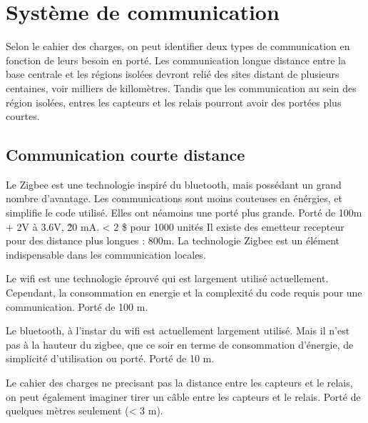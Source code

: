 \section{Système de communication}

Selon le cahier des charges, on peut identifier deux types de communication en fonction de leurs besoin en porté.
Les communication longue distance entre la base centrale et les régions isolées devront relié des sites distant de plusieurs centaines, voir milliers de killomètres.
Tandis que les communication au sein des région isolées, entres les capteurs et les relais pourront avoir des portées plus courtes.



    \subsection{Communication courte distance}

            { Le Zigbee est une technologie inspiré du bluetooth, mais possédant un grand nombre d'avantage.
            Les communications sont moins couteuses en énérgies, et simplifie le code utilisé.
            Elles ont néamoins une porté plus grande.}
            {Porté de 100m +
            }
            {2V à 3.6V, \~20 mA.
            }
            {< 2 \$ pour 1000 unités
            }
            {Il existe des emetteur recepteur pour des distance plus longues : 800m.
            }
            {La technologie Zigbee est un élément indispensable dans les communication locales.
            }

            { Le wifi est une technologie éprouvé qui est largement utilisé actuellement.
            Cependant, la consommation en energie et la complexité du code requis pour une communication. }
            {Porté de 100 m.
            }
            {
            }
            {
            }
            {
            }
            {
            }

            { Le bluetooth, à l'instar du wifi est actuellement largement utilisé.
            Mais il n'est pas à la hauteur du zigbee, que ce soir en terme de consommation d'énergie, de simplicité d'utilisation ou porté.}
            {Porté de 10 m.
            }
            {
            }
            {
            }
            {
            }
            {
            }
            
            { Le cahier des charges ne precisant pas la distance entre les capteurs et le relais, on peut également imaginer tirer un câble entre les capteurs et le relais. }
            {Porté de quelques mètres seulement (< 3 m).
            }
            {
            }
            {
            }
            {
            }
            {
            }   
            


